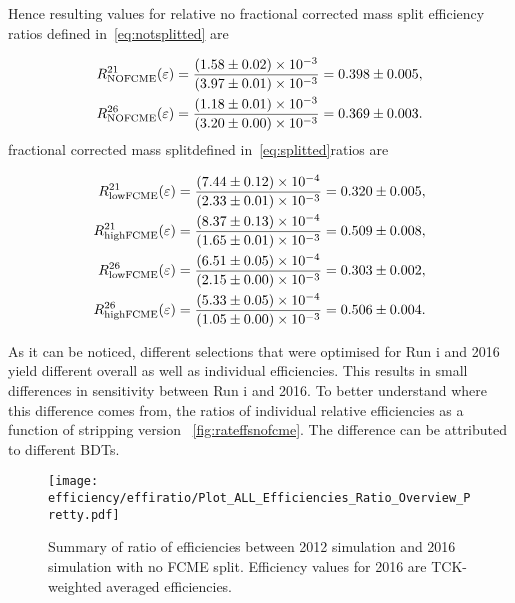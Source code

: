 Hence resulting values for \DIFaddbegin {}\DIFaddend relative no fractional corrected mass split efficiency ratios defined in~\autoref{eq:notsplitted} are

\begin{equation}
\begin{aligned}
	R^{21}_{\rm{NOFCME}}(\varepsilon)=\frac{(1.58\pm0.02)\times 10 ^{-3 }}{(3.97\pm0.01)\times 10 ^{-3 }}=0.398\pm0.005,\\
	R^{26}_{\rm{NOFCME}}(\varepsilon)=\frac{(1.18\pm0.01)\times 10 ^{-3 }}{(3.20\pm0.00)\times 10 ^{-3 }}=0.369\pm0.003.
\end{aligned}
\label{eq:nofcmeer}
\end{equation}
\DIFdelbegin {}\DIFdelend \DIFaddbegin {}\DIFaddend fractional corrected mass split\DIFaddbegin {}\DIFaddend defined in~\autoref{eq:splitted}\DIFdelbegin {}\DIFdelend \DIFaddbegin {}\DIFaddend ratios are

\begin{equation}
\begin{aligned}
	R^{21}_{\rm{lowFCME}}(\varepsilon)=\frac{(7.44\pm0.12)\times 10 ^{-4 }}{(2.33\pm0.01)\times 10 ^{-3 }}= 0.320\pm0.005,\\
	R^{21}_{\rm{highFCME}}(\varepsilon)=\frac{(8.37\pm0.13)\times 10 ^{-4 }}{(1.65\pm0.01)\times 10 ^{-3 }}=0.509\pm0.008,\\
	R^{26}_{\rm{lowFCME}}(\varepsilon)=\frac{(6.51\pm0.05)\times 10 ^{-4 }}{(2.15\pm0.00)\times 10 ^{-3 }}=0.303\pm0.002,\\
	R^{26}_{\rm{highFCME}}(\varepsilon)=\frac{(5.33\pm0.05)\times 10 ^{-4 }}{(1.05\pm0.00)\times 10 ^{-3 }}=0.506\pm0.004.
\end{aligned}
\label{eq:allfcmeer}
\end{equation}

	
As it can be noticed, different selections that were optimised for Run \Rn{1} and 2016 yield different overall as well as individual efficiencies. This results in small differences in sensitivity between Run \Rn{1} and 2016. To better understand where this difference comes from, the ratios of individual relative efficiencies as a function of stripping version \DIFdelbegin {}\DIFdelend \DIFaddbegin {}\DIFaddend ~\autoref{fig:rateffsnofcme}. The difference can be attributed to different BDTs.

\begin{figure}[H]
\centering
\texttt{[image: efficiency/effiratio/Plot\_ALL\_Efficiencies\_Ratio\_Overview\_Pretty.pdf]}
\caption{Summary of ratio of efficiencies between 2012 simulation and 2016 simulation with no FCME split. Efficiency values for 2016 are TCK-weighted averaged efficiencies.}
\centering
\label{fig:rateffsnofcme}
\end{figure}

